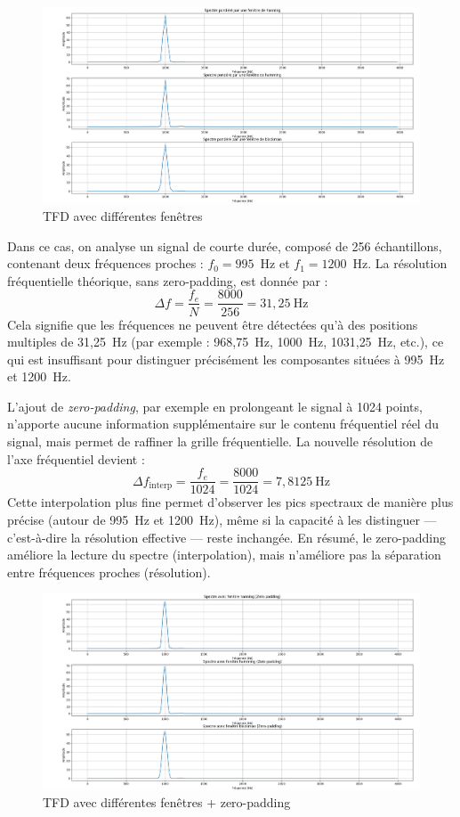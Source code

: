 \begin{figure}[h!]
    \centering
    \includegraphics[width=18cm]{screenshots/3_4_2_figures.png}
    \caption{TFD avec différentes fenêtres}
\end{figure}

Dans ce cas, on analyse un signal de courte durée, composé de 256 échantillons, contenant deux fréquences proches : $f_0 = 995$~Hz et $f_1 = 1200$~Hz. La résolution fréquentielle théorique, sans zero-padding, est donnée par :
\[
\Delta f = \frac{f_e}{N} = \frac{8000}{256} = 31{,}25~\text{Hz}
\]
Cela signifie que les fréquences ne peuvent être détectées qu'à des positions multiples de 31,25~Hz (par exemple : 968{,}75~Hz, 1000~Hz, 1031{,}25~Hz, etc.), ce qui est insuffisant pour distinguer précisément les composantes situées à 995~Hz et 1200~Hz.

L'ajout de \textit{zero-padding}, par exemple en prolongeant le signal à 1024 points, n'apporte aucune information supplémentaire sur le contenu fréquentiel réel du signal, mais permet de raffiner la grille fréquentielle. La nouvelle résolution de l'axe fréquentiel devient :
\[
\Delta f_{\text{interp}} = \frac{f_e}{1024} = \frac{8000}{1024} = 7{,}8125~\text{Hz}
\]
Cette interpolation plus fine permet d’observer les pics spectraux de manière plus précise (autour de 995~Hz et 1200~Hz), même si la capacité à les distinguer — c’est-à-dire la résolution effective — reste inchangée. En résumé, le zero-padding améliore la lecture du spectre (interpolation), mais n'améliore pas la séparation entre fréquences proches (résolution).

\begin{figure}[h!]
    \centering
    \includegraphics[width=18cm]{screenshots/3_4_2_figures_avec_padding.png}
    \caption{TFD avec différentes fenêtres + zero-padding}
\end{figure}

